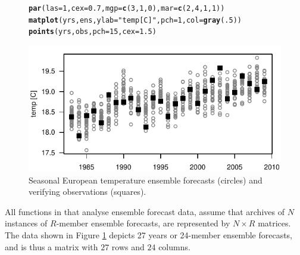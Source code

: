 \documentclass[article]{jss}\usepackage{graphicx, color}
\makeatletter
\def\maxwidth{ %
  \ifdim\Gin@nat@width>\linewidth
    \linewidth
  \else
    \Gin@nat@width
  \fi
}
\newcommand{\hlfunctioncall}[1]{\textcolor[rgb]{0,0.501960784313725,0.752941176470588}{\textbf{#1}}}%
\newcommand{\hlstring}[1]{\textcolor[rgb]{0.650980392156863,0.52156862745098,0}{#1}}%
\newenvironment{kframe}{%
 \def\at@end@of@kframe{}%
 \ifinner\ifhmode%
  \def\at@end@of@kframe{\end{minipage}}%
  \begin{minipage}{\columnwidth}%
 \fi\fi%
 \def\FrameCommand##1{\hskip\@totalleftmargin \hskip-\fboxsep
 \colorbox{shadecolor}{##1}\hskip-\fboxsep
     \hskip-\linewidth \hskip-\@totalleftmargin \hskip\columnwidth}%
 \MakeFramed {\advance\hsize-\width
   \@totalleftmargin\z@ \linewidth\hsize
   \@setminipage}}%
 {\par\unskip\endMakeFramed%
 \at@end@of@kframe}
\newenvironment{knitrout}{}{} %
\makeatother
\begin{document}
\begin{figure}
\begin{center}
%
\begin{knitrout}
\color{fgcolor}\begin{kframe}
\begin{alltt}
\hlfunctioncall{par}(las=1, cex=0.7, mgp=\hlfunctioncall{c}(3, 1, 0), mar=\hlfunctioncall{c}(2,4,1,1))
\hlfunctioncall{matplot}(yrs, ens, ylab=\hlstring{"temp [C]"}, pch=1, col=\hlfunctioncall{gray}(.5))
\hlfunctioncall{points}(yrs, obs, pch=15, cex=1.5)
\end{alltt}
\end{kframe}
\includegraphics[width=\maxwidth]{figure/gfs-plot} 

\end{knitrout}

%
\end{center}
\caption{Seasonal European temperature ensemble forecasts (circles) and verifying observations (squares).}
\label{gfs-plot}
\end{figure}


All functions in  that analyse ensemble forecast data, assume that archives of $N$ instances of $R$-member ensemble forecasts, are represented by $N\times R$ matrices.
The data shown in Figure \ref{gfs-plot} depicts 27 years or 24-member ensemble forecasts, and is thus a  matrix with $27$ rows and $24$ columns.
\end{document}
